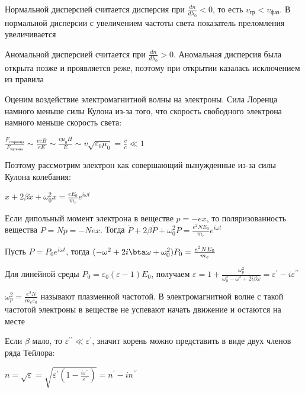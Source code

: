 \documentclass[12pt]{article}
\begin{document}






Нормальной дисперсией считается дисперсия при $\frac{dn}{d\lambda_0} < 0$, то есть $v_{\text{гр}} < v_{\text{фаз}}$. В нормальной дисперсии с увеличением частоты света показатель преломления увеличивается

Аномальной дисперсией считается при $\frac{dn}{d\lambda_0} > 0$. Аномальная дисперсия была открыта позже и проявляется реже, поэтому при открытии казалась исключением из правила

\mediumvspace

Оценим воздействие электромагнитной волны на электроны. Сила Лоренца намного меньше силы Кулона из-за того, что скорость свободного электрона намного меньше скорость света:

$\frac{F_{\text{Лоренца}}}{F_{\text{Кулона}}} \sim \frac{v e B}{e E} \sim \frac{v \mu_0 H}{E} \sim v \sqrt{\varepsilon_0 \mu_0} = \frac{v}{c} \ll 1$

Поэтому рассмотрим электрон как совершающий вынужденные из-за силы Кулона колебания:

$\ddot x + 2 \beta \dot x + \omega_0^2 x = \frac{e E_0}{m_e} e^{i \omega t}$

Если дипольный момент электрона в веществе $p = -ex$, то поляризованность вещества $P = Np = -Nex$. Тогда $\ddot P + 2 \beta \dot P + \omega^2_0 P = \frac{e^2 N E_0}{m_e} e^{i \omega t}$

Пусть $P = P_0 e^{i \omega t}$, тогда $(-\omega^2 + 2 i \bta \omega + \omega_0^2) P_0 = \frac{e^2 N E_0}{m_e}$

Для линейной среды $P_0 = \varepsilon_0 (\varepsilon - 1) E_0$, получаем $\varepsilon = 1 + \frac{\omega_p^2}{\omega_0^2 - \omega^2 + 2i\beta \omega} = \varepsilon^{\prime} - i \varepsilon^{\prime\prime}$

$\omega_p^2 = \frac{e^2 N}{m_e \varepsilon_0}$ называют плазменной частотой. В электромагнитной волне с такой частотой электроны в веществе не успевают начать движение и остаются на месте

Если $\beta$ мало, то $\varepsilon^{\prime\prime} \ll \varepsilon^{\prime}$, значит корень можно представить в виде двух членов ряда Тейлора:

$n = \sqrt{\varepsilon} = \sqrt{\varepsilon^{\prime} \left(1 - \frac{i \varepsilon^{\prime\prime}}{\varepsilon^{\prime}}\right)} = n^{\prime} - i n^{\prime\prime}$
\end{document}
